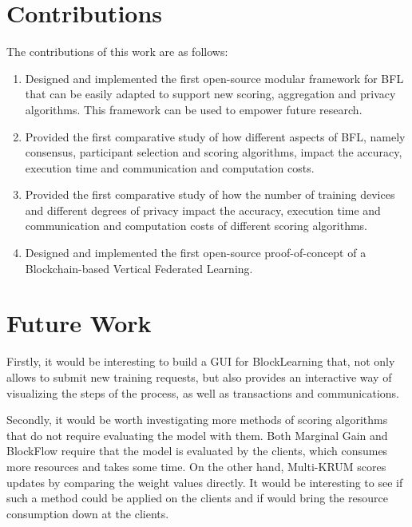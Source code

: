 
\section{Contributions}\label{conclusions:contributions}

The contributions of this work are as follows:

\begin{enumerate}
    \item Designed and implemented the first open-source modular framework for BFL that can be easily adapted to support new scoring, aggregation and privacy algorithms. This framework can be used to empower future research.
    
    \item Provided the first comparative study of how different aspects of BFL, namely consensus, participant selection and scoring algorithms, impact the accuracy, execution time and communication and computation costs.
    
    \item Provided the first comparative study of how the number of training devices and different degrees of privacy impact the accuracy, execution time and communication and computation costs of different scoring algorithms.
    
    \item Designed and implemented the first open-source proof-of-concept of a Blockchain-based Vertical Federated Learning.
\end{enumerate}

\section{Future Work}\label{conclusions:future_work}

Firstly, it would be interesting to build a GUI for BlockLearning that, not only allows to submit new training requests, but also provides an interactive way of visualizing the steps of the process, as well as transactions and communications.

Secondly, it would be worth investigating more methods of scoring algorithms that do not require evaluating the model with them. Both Marginal Gain and BlockFlow require that the model is evaluated by the clients, which consumes more resources and takes some time. On the other hand, Multi-KRUM scores updates by comparing the weight values directly. It would be interesting to see if such a method could be applied on the clients and if would bring the resource consumption down at the clients.

